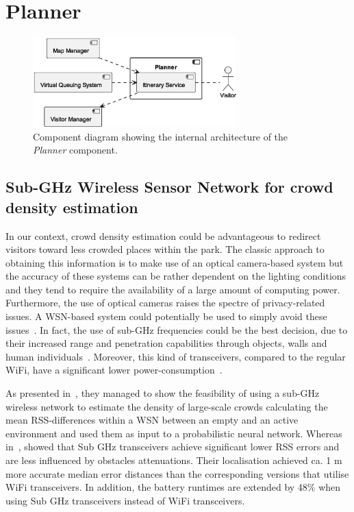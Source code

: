 \section{Planner}

\begin{figure}[H]
	\centering
	\includegraphics[width=0.7\textwidth]{img/planner.eps}
	\caption{Component diagram showing the internal architecture of the \textit{Planner} component.
	}
	\label{fig:planner-arch}
\end{figure}

\subsection{Sub-GHz Wireless Sensor Network for crowd density estimation}\label{subsec:sub-ghz-wireless-sensor-network-for-crowd-density-estimation}
In our context, crowd density estimation could be advantageous to redirect visitors toward less crowded places within the park.
The classic approach to obtaining this information is to make use of an optical camera-based system but the accuracy of these systems can be
rather dependent on the lighting conditions and they tend to require the availability of a large amount of computing power.
Furthermore, the use of optical cameras raises the spectre of privacy-related issues.
A WSN-based system could potentially be used to simply avoid these issues~\cite{denis2018large}.
In fact, the use of sub-GHz frequencies could be the best decision, due to their increased range and penetration capabilities through objects, walls and human individuals~\cite{denis2018large}.
Moreover, this kind of transceivers, compared to the regular WiFi, have a significant lower power-consumption~\cite{fudickar2014comparing}.

As presented in~\cite{denis2018large}, they managed to show the feasibility of using a sub-GHz wireless network to estimate the
density of large-scale crowds calculating the mean RSS-differences within a WSN between an empty and an active environment and used them
as input to a probabilistic neural network.
Whereas in~\cite{fudickar2014comparing}, showed that Sub GHz transceivers achieve significant lower RSS errors and are less influenced by obstacles attenuations.
Their localisation achieved ca. 1 m more accurate median error distances than the corresponding versions that utilise WiFi transceivers.
In addition, the battery runtimes are extended by 48\% when using Sub GHz transceivers instead of WiFi transceivers.


